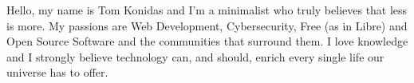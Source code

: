 \documentclass[9pt]{developercv} %
\begin{document}
\vspace{0.5cm}



\begin{minipage}[t]{0.4\textwidth} %
	\vspace{-\baselineskip} %
	
  Hello, my name is Tom Konidas and I'm a minimalist who truly believes that less is more. 
  My passions are Web Development, Cybersecurity, Free (as in Libre) and Open Source Software and the communities that surround them.
  I love knowledge and I strongly believe technology can, and should, enrich every single 
  life our universe has to offer.
\end{minipage}
\hfill %
\begin{minipage}[t]{0.5\textwidth} %
	\vspace{-\baselineskip} %
	\begin{barchart}{5.5}
	\end{barchart}
\end{minipage}


\end{document}
